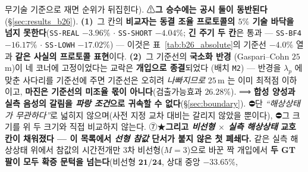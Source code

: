\documentclass[11pt]{report}
\numberwithin{equation}{chapter}
\numberwithin{figure}{chapter}
\numberwithin{table}{chapter}
\begin{document}
\begin{enumerate}
        무기술 기준으로 재면 순위가 뒤집힌다).
        ⚠\textbf{그 승수에는 공시 둘이 동반된다}(\S\ref{sec:results_b26}).
        \textbf{(1)}~그 칸의 \textbf{비교자는 동결 조율 프로토콜의 $5\%$ 기술 바닥을 넘지
        못한다}(\texttt{SS-REAL} $-3.96\%$ $\cdot$ \texttt{SS-SHORT} $-4.04\%$;
        \textbf{긴 주기 두 칸}은 통과 --- \texttt{SS-BF4} $-16.17\%$ $\cdot$
        \texttt{SS-LOWH} $-17.02\%$) --- 이것은 표~\ref{tab:b26_absolute}의 기준선 $-4.0\%$ 열과
        \textbf{같은 사실의 프로토콜 표현}이다. \textbf{(2)}~그 기준선의 \textbf{국소화 반경}
        (Gaspari--Cohn $25$\,m)이 네 코너에 고정이었다는 교락은 \textbf{개입으로 종결}되었다
        (배치 \texttt{M2}) --- 반경을 $\lambda_p$ 에 맞춘 사다리를 기준선에 주면 기준선은 오히려
        \emph{나빠지므로} $25$\,m 는 이미 최적점 이하이고, \textbf{마진은 기준선의 미조율 몫이
        아니다}(검출가능효과 $26.28\%$).
        ⟹ \textbf{합성 양성과 실측 음성의 갈림을 \emph{파랑
        조건}으로 귀속할 수 없다}(\S\ref{sec:boundary}). ⛔단 \emph{``해상상태가
        무관하다''}로 넓히지 않으며(사전 지정 교차 대비는 갈리지 않았을 뿐이다),
        ⛔그 크기를 위 두 크기와 직접 비교하지 않는다.
        ⑦★\textbf{그리고 \emph{비선형 $\times$ 실측 해상상태} 교호 칸이 채워졌다 --- 이
        목록에서 \emph{선형 참값} 단서가 붙지 않은 첫 폐쇄다.} 같은 실측 해상상태 위에서
        참값의 시간전개만 $3$차 비선형($M{=}3$)으로 바꾼 짝 개입에서 \textbf{두 GT 팔이 모두
        확증 문턱을 넘는다}(비선형 $\mathbf{21/24}$, 상대 중앙 $\mathbf{-33.65\%}$,

\end{enumerate}
\end{document}
